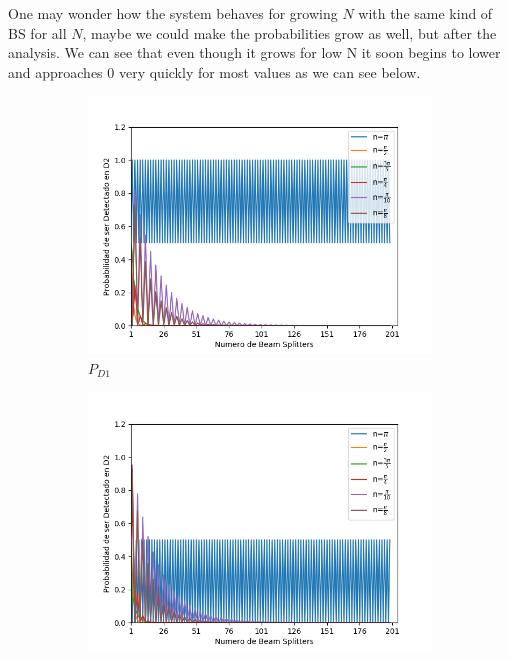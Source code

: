 \documentclass[12pt]{book}
\begin{document}
One may wonder how the system behaves for growing $N$ with the same kind of BS for all $N$, maybe we could make the probabilities grow as well, but after the analysis. We can see that even though it grows for low N it soon begins to lower and approaches 0 very quickly for most values as we can see below. 


\begin{figure}[!htb]
\centering
\begin{subfigure}[b]{0.45\linewidth}
\includegraphics[width=\linewidth]{images/BsFijo_azumaD1.png}
\caption{$P_{D1}$}
\label{fig:BS1}
\end{subfigure}
\begin{subfigure}[b]{0.45\linewidth}
\includegraphics[width=\linewidth]{images/BsFijo_azumaD2.png}

\end{subfigure}
\end{figure}
\end{document}
